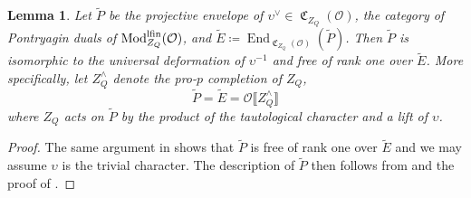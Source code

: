 \documentclass[leqno]{amsart}
\newtheorem{lem}[thm]{Lemma}
\theoremstyle{definition}
\theoremstyle{remark}
\newcommand{\oo}{\mathcal{O}}
\DeclareMathOperator{\End}{End}
\DeclareMathOperator{\Mod}{\textnormal{Mod}}
\DeclareMathOperator{\fC}{\mathfrak{C}} %
\newcommand{\lfin}{\textnormal{lfin}}
\begin{document}
\begin{lem}\label{lem:end_comp}
Let $\tilde{P}$ be the projective envelope of 
$\upsilon^\vee\in \fC_{Z_Q}(\oo)$, the category
of Pontryagin duals of $\Mod_{Z_Q}^{\lfin}(\oo)$,
and $\tilde{E}\coloneqq\End_{\fC_{Z_Q}(\oo)}(\tilde{P})$.
Then $\tilde{P}$ is isomorphic to 
the universal deformation of $\upsilon^{-1}$
and free of rank one over $\tilde{E}$.
More specifically,
let $Z_Q^\wedge$ denote the pro-$p$ completion of $Z_Q$,
\[
    \tilde{P}=\tilde{E}
    =\oo\llbracket Z_Q^\wedge\rrbracket
\]
where $Z_Q$ acts on $\tilde{P}$
by the product of the tautological character
and a lift of $\upsilon$.
\end{lem}
\begin{proof}
The same argument in \cite[Prop. 3.34]{pask} 
shows that $\tilde{P}$
is free of rank one over $\tilde{E}$
and we may assume $\upsilon$ is the trivial character.
The description of $\tilde{P}$ then follows from 
\cite[Cor. 3.27]{pask} and the proof of
\cite[Lem. 3.32]{pask}.
\end{proof}
\end{document}
